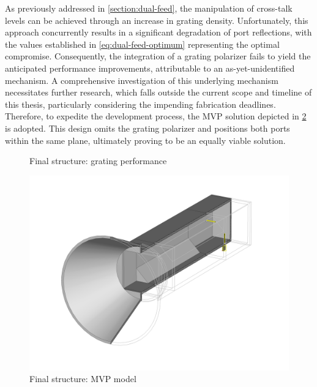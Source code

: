 \documentclass[11pt,a4paper,twoside,openany]{report}
\begin{document}
As previously addressed in \cref{section:dual-feed}, the manipulation of cross-talk levels can be achieved through an increase in grating density. Unfortunately, this approach concurrently results in a significant degradation of port reflections, with the values established in \cref{eq:dual-feed-optimum} representing the optimal compromise. Consequently, the integration of a grating polarizer fails to yield the anticipated performance improvements, attributable to an as-yet-unidentified mechanism. A comprehensive investigation of this underlying mechanism necessitates further research, which falls outside the current scope and timeline of this thesis, particularly considering the impending fabrication deadlines. Therefore, to expedite the development process, the MVP solution depicted in \cref{fig:final-perspective} is adopted. This design omits the grating polarizer and positions both ports within the same plane, ultimately proving to be an equally viable solution.

\begin{figure}[!ht]
    \centering
    
    \caption{\label{fig:grating-vs-mvp-sparameters}Final structure: grating performance}
\end{figure}

%     

\begin{figure}[!ht]
    \centering
    \includegraphics[width=.8\textwidth]{src/final_perspective.png}
    \caption{\label{fig:final-perspective}Final structure: MVP model}
\end{figure}
\end{document}

